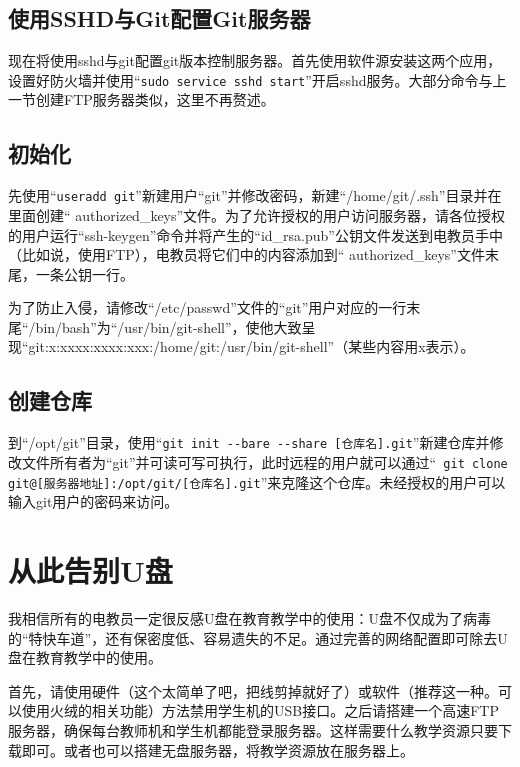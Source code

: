 \subsection{使用SSHD与Git配置Git服务器}
现在将使用sshd与git配置git版本控制服务器。首先使用软件源安装这两个应用，设置好防火墙并使用“\verb|sudo service sshd start|”开启sshd服务。大部分命令与上一节创建FTP服务器类似，这里不再赘述。
\subsection{初始化}
先使用“\verb|useradd git|”新建用户“git”并修改密码，新建“/home/git/.ssh”目录并在里面创建“ authorized\_keys”文件。为了允许授权的用户访问服务器，请各位授权的用户运行“ssh-keygen”命令并将产生的“id\_rsa.pub”公钥文件发送到电教员手中（比如说，使用FTP），电教员将它们中的内容添加到“ authorized\_keys”文件末尾，一条公钥一行。\par
为了防止入侵，请修改“/etc/passwd”文件的“git”用户对应的一行末尾“/bin/bash”为“/usr/bin/git-shell”，使他大致呈现“git:x:xxxx:xxxx:xxx:/home/git:/usr/bin/git-shell”（某些内容用x表示）。
\subsection{创建仓库}
到“/opt/git”目录，使用“\verb|git init --bare --share [仓库名].git|”新建仓库并修改文件所有者为“git”并可读可写可执行，此时远程的用户就可以通过“\verb| git clone git@[服务器地址]:/opt/git/[仓库名].git|”来克隆这个仓库。未经授权的用户可以输入git用户的密码来访问。
\section{从此告别U盘}
我相信所有的电教员一定很反感U盘在教育教学中的使用：U盘不仅成为了病毒的“特快车道”，还有保密度低、容易遗失的不足。通过完善的网络配置即可除去U盘在教育教学中的使用。\par
首先，请使用硬件（这个太简单了吧，把线剪掉就好了）或软件（推荐这一种。可以使用火绒的相关功能）方法禁用学生机的USB接口。之后请搭建一个高速FTP服务器，确保每台教师机和学生机都能登录服务器。这样需要什么教学资源只要下载即可。或者也可以搭建无盘服务器，将教学资源放在服务器上。
